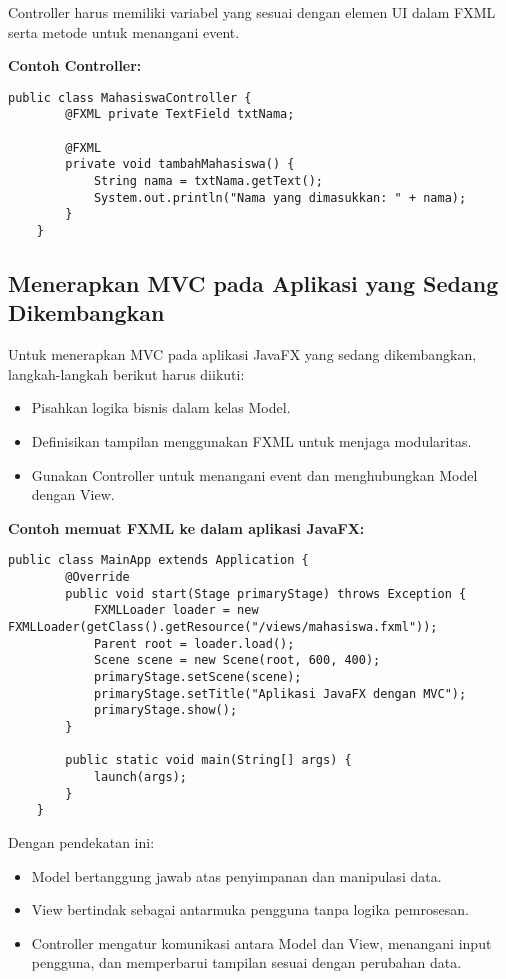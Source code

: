 Controller harus memiliki variabel yang sesuai dengan elemen UI dalam FXML serta metode untuk menangani event.

\textbf{Contoh Controller:}
\begin{lstlisting}[style=JavaStyle, caption=MahasiswaController.java]
	public class MahasiswaController {
		@FXML private TextField txtNama;
		
		@FXML
		private void tambahMahasiswa() {
			String nama = txtNama.getText();
			System.out.println("Nama yang dimasukkan: " + nama);
		}
	}
\end{lstlisting}

\subsection{Menerapkan MVC pada Aplikasi yang Sedang Dikembangkan}

Untuk menerapkan MVC pada aplikasi JavaFX yang sedang dikembangkan, langkah-langkah berikut harus diikuti:

\begin{itemize}
	\item Pisahkan logika bisnis dalam kelas Model.
	\item Definisikan tampilan menggunakan FXML untuk menjaga modularitas.
	\item Gunakan Controller untuk menangani event dan menghubungkan Model dengan View.
\end{itemize}

\textbf{Contoh memuat FXML ke dalam aplikasi JavaFX:}
\begin{lstlisting}[style=JavaStyle, caption=Memuat FXML dalam aplikasi JavaFX]
	public class MainApp extends Application {
		@Override
		public void start(Stage primaryStage) throws Exception {
			FXMLLoader loader = new FXMLLoader(getClass().getResource("/views/mahasiswa.fxml"));
			Parent root = loader.load();
			Scene scene = new Scene(root, 600, 400);
			primaryStage.setScene(scene);
			primaryStage.setTitle("Aplikasi JavaFX dengan MVC");
			primaryStage.show();
		}
		
		public static void main(String[] args) {
			launch(args);
		}
	}
\end{lstlisting}

Dengan pendekatan ini:
\begin{itemize}
	\item Model bertanggung jawab atas penyimpanan dan manipulasi data.
	\item View bertindak sebagai antarmuka pengguna tanpa logika pemrosesan.
	\item Controller mengatur komunikasi antara Model dan View, menangani input pengguna, dan memperbarui tampilan sesuai dengan perubahan data.
\end{itemize}

